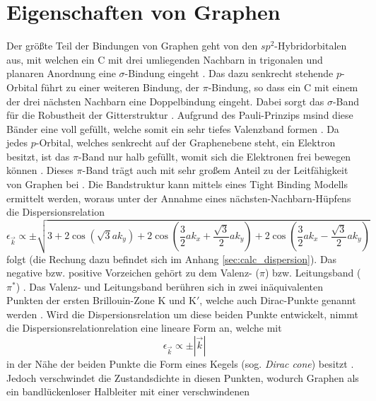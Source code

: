 \section{Eigenschaften von Graphen}
\label{sec:propertiesofgraphene}
Der größte Teil der Bindungen von Graphen geht von den $sp^2$-Hybridorbitalen aus, mit welchen ein C mit drei umliegenden
Nachbarn in trigonalen und planaren Anordnung eine $\sigma$-Bindung eingeht \cite{RevModPhys.81.109}.
Das dazu senkrecht stehende $p$-Orbital führt zu einer weiteren Bindung, der $\pi$-Bindung, so dass ein C
mit einem der drei nächsten Nachbarn eine Doppelbindung eingeht.
Dabei sorgt das $\sigma$-Band für die Robustheit der Gitterstruktur \cite{RevModPhys.81.109}.
Aufgrund des Pauli-Prinzips msind diese Bänder eine voll gefüllt, welche somit ein sehr tiefes Valenzband
formen \cite{RevModPhys.81.109}.
Da jedes $p$-Orbital, welches senkrecht auf der Graphenebene steht, ein Elektron
besitzt, ist das $\pi$-Band nur halb gefüllt, womit sich die Elektronen frei bewegen können \cite{RevModPhys.81.109, graphene_properties}.
Dieses $\pi$-Band trägt auch mit sehr großem Anteil zu der Leitfähigkeit von Graphen bei \cite{graphene_properties}.
Die Bandstruktur kann mittels eines Tight Binding Modells ermittelt werden, woraus unter der Annahme eines nächsten-Nachbarn-Hüpfens
die Dispersionsrelation 
\begin{equation*}
    \epsilon_{\vec{k}} \propto \pm \sqrt{3+2 \cos \left ( \sqrt{3}ak_y \right )+2\cos \left ( \frac{3}{2}ak_x+\frac{\sqrt{3}}{2}ak_y \right ) + 2\cos \left ( \frac{3}{2}ak_x-\frac{\sqrt{3}}{2}ak_y \right ) }
\end{equation*}
folgt (die Rechung dazu befindet sich im Anhang \ref{sec:calc_dispersion}).
Das negative bzw. positive Vorzeichen gehört zu dem Valenz- ($\pi$) bzw. Leitungsband ($\pi^*$) \cite{RevModPhys.81.109}.
Das Valenz- und Leitungsband berühren sich in zwei inäquivalenten Punkten der ersten Brillouin-Zone K und $\text{K}'$, welche 
auch Dirac-Punkte genannt werden \cite{10.1093/nsr/nwu080}.
Wird die Dispersionsrelation um diese beiden Punkte entwickelt, nimmt die Dispersionsrelationrelation eine lineare Form an, welche mit 
\begin{equation}
    \epsilon_{\vec{k}} \propto \pm | \vec{k} | 
\end{equation}
in der Nähe der beiden Punkte die Form eines Kegels (sog. \textit{Dirac cone}) besitzt \cite{10.1093/nsr/nwu080, Avouris2007}.
Jedoch verschwindet die Zustandsdichte in diesen Punkten, wodurch Graphen als ein bandlückenloser Halbleiter mit einer verschwindenen 
